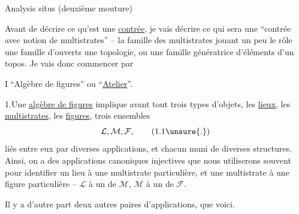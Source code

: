 \begin{center}Analysis situs (deuxième mouture)\end{center}

Avant de décrire ce qu'est une \uline{contrée}, je vais décrire ce qui sera une ``contrée avec notion de multistrates'' -- la famille des multistrates  jouant un peu le rôle  une famille d'ouverts   une topologie, ou une famille génératrice d'éléments d'un topos. Je vais donc commencer par

\textcircled{I}\quad ``Algèbre de figures'' ou ``\uline{Atelier}''.

1.\quad Une \uline{algèbre de figures} implique avant tout trois types d'objets, les \uline{lieux}, les \uline{multistrates}, les \uline{figures},  trois ensembles
\[
\mathcal{L},\mathcal{M},\mathcal{F},\tag*{(1.1\unsure{.})}
\]
liés entre eux par diverses applications, et chacun muni de diverses structures. Ainsi, on a des applications canoniques injectives
que nous utiliserons souvent pour identifier un lieu à une multistrate particulière, et une multistrate à une figure particulière -- $\mathcal{L}$ à un  de $\mathcal{M}$, $\mathcal{M}$ à un  de $\mathcal{F}$.

Il y a d'autre part deux autres paires d'applications, que voici.
